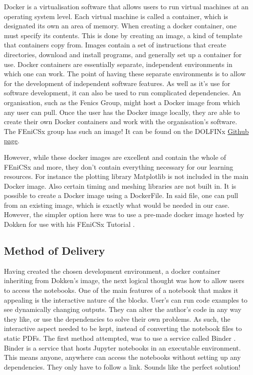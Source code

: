 Docker is a virtualisation software that allows users to run virtual machines at an operating system level. Each virtual machine is called a container, which is designated its own an area of memory. When creating a docker container, one must specify its contents. This is done by creating an image, a kind of template that containers copy from. Images contain a set of instructions that create directories, download and install programs, and generally set up a container for use. Docker containers are essentially separate, independent environments in which one can work. The point of having these separate environments is to allow for the development of independent software features. As well as it's use for software development, it can also be used to run complicated dependencies. An organisation, such as the Fenics Group, might host a Docker image from which any user can pull. Once the user has the Docker image locally, they are able to create their own Docker containers and work with the organisation's software. The FEniCSx group has such an image! It can be found on the DOLFINx \href{https://github.com/FEniCS/dolfinx#docker-images}{Github page}. 

However, while these docker images are excellent and contain the whole of FEniCSx and more, they don't contain everything necessary for our learning resources. For instance the plotting library Matplotlib is not included in the main Docker image. Also certain timing and meshing libraries are not built in. It is possible to create a Docker image using a DockerFile. In said file, one can pull from an existing image, which is exactly what would be needed in our case. However, the simpler option here was to use a pre-made docker image hosted by Dokken for use with his FEniCSx Tutorial \cite{dokken-docker}.

\subsection{Method of Delivery}

Having created the chosen development environment, a docker container inheriting from Dokken's image, the next logical thought was how to allow users to access the notebooks. One of the main features of a notebook that makes it appealing is the interactive nature of the blocks. User's can run code examples to see dynamically changing outputs. They can alter the author's code in any way they like, or use the dependencies to solve their own problems. As such, the interactive aspect needed to be kept, instead of converting the notebook files to static PDFs. The first method attempted, was to use a service called Binder \cite{binder}. Binder is a service that hosts Jupyter notebooks in an executable environment. This means anyone, anywhere can access the notebooks without setting up any dependencies. They only have to follow a link. Sounds like the perfect solution!

